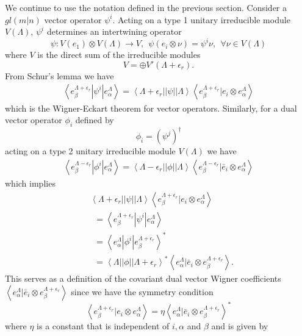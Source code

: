 \documentclass[12pt]{article}
\begin{document}
We continue to use the notation defined in the previous section. Consider a $gl(m|n)$ vector operator $\psi^i$. Acting on a type 1 unitary irreducible module $V(\Lambda)$, $\psi^i$ determines an intertwining operator 
$$
\psi: V(e_1) \otimes V(\Lambda) \rightarrow V, ~~ \psi(e_i \otimes \nu) = \psi^i \nu, ~~\forall \nu \in V(\Lambda)
$$
where $V$ is the direct sum of the irreducible modules
$$
V = \oplus V'(\Lambda + \epsilon_r).
$$
From Schur's lemma we have
\begin{align*}
\left\langle e_\beta^{\Lambda  + \epsilon_r} | \psi^i | e^{\Lambda}_\alpha \right\rangle 
= \left \langle \Lambda + \epsilon_r || \psi || \Lambda \right \rangle
\left\langle e^{\Lambda+\epsilon_r}_\beta | e_i \otimes e^{\Lambda}_\alpha \right\rangle
\end{align*}
which is the Wigner-Eckart theorem for vector operators. Similarly, for a dual vector operator $\phi_i$ defined by
$$
\phi_i = (\psi^j)^\dagger
$$
acting on a type 2 unitary irreducible module $V(\Lambda)$  we have
\begin{align*}
\left\langle e_\beta^{\Lambda  - \epsilon_r} | \phi^i | e^{\Lambda}_\alpha \right\rangle 
= \left \langle \Lambda - \epsilon_r || \phi || \Lambda \right \rangle
\left\langle e^{\Lambda-\epsilon_r}_\beta | \bar{e}_i \otimes e^{\Lambda}_\alpha \right\rangle
\end{align*}
which implies
~~
\begin{align*}
&\left \langle \Lambda + \epsilon_r || \psi || \Lambda \right \rangle
\left\langle e^{\Lambda+\epsilon_r}_\beta | e_i \otimes e^{\Lambda}_\alpha \right\rangle \\
&~~= \left\langle e_\beta^{\Lambda  + \epsilon_r} | \psi^i | e^{\Lambda}_\alpha \right\rangle \\
&~~= \left\langle e_\alpha^{\Lambda} | \phi^i | e^{\Lambda + \epsilon_r}_\beta \right\rangle^*\\
&~~=\left \langle \Lambda || \phi || \Lambda + \epsilon_r \right \rangle^*
\left\langle e^{\Lambda}_\alpha | \bar{e}_i \otimes e^{\Lambda+\epsilon_r}_\beta \right\rangle.
\end{align*}
This serves as a definition of the  covariant dual vector Wigner coefficients $\left\langle e^{\Lambda}_\alpha | \bar{e}_i \otimes e^{\Lambda+\epsilon_r}_\beta \right\rangle$ since we have the symmetry condition
$$
\left\langle e^{\Lambda+\epsilon_r}_\beta | e_i \otimes e^{\Lambda}_\alpha \right\rangle
= \eta \left\langle e^{\Lambda}_\alpha | \bar{e}_i \otimes e^{\Lambda+\epsilon_r}_\beta \right\rangle^*
$$
where $\eta$ is a constant that is independent of $i, \alpha$ and $\beta$ and is given by
\end{document}
